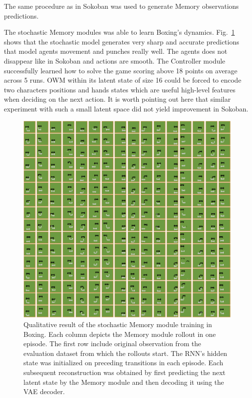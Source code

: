 The same procedure as in Sokoban was used to generate Memory observations predictions.

The stochastic Memory modules was able to learn Boxing’s dynamics. Fig.~\ref{Fig.WM_Boxing_memory} shows that the stochastic model generates very sharp and accurate predictions that model agents movement and punches really well. The agents does not disappear like in Sokoban and actions are smooth.
The Controller module successfully learned how to solve the game scoring above 18 points on average across 5 runs. OWM within its latent state of size 16 could be forced to encode two characters positions and hands states which are useful high-level features when deciding on the next action. It is worth pointing out here that similar experiment with such a small latent space did not yield improvement in Sokoban.

\begin{figure}[H]
\includegraphics[width=1\textwidth,keepaspectratio]{figures/Boxing_memory.png}
\caption[Qualitative result of the World Models' stochastic Memory module training in Boxing]{Qualitative result of the stochastic Memory module training in Boxing. Each column depicts the Memory module rollout in one episode. The first row include original observation from the evaluation dataset from which the rollouts start. The RNN's hidden state was initialized on preceding transitions in each episode. Each subsequent reconstruction was obtained by first predicting the next latent state by the Memory module and then decoding it using the VAE decoder.}
\label{Fig.WM_Boxing_memory}
\end{figure}

